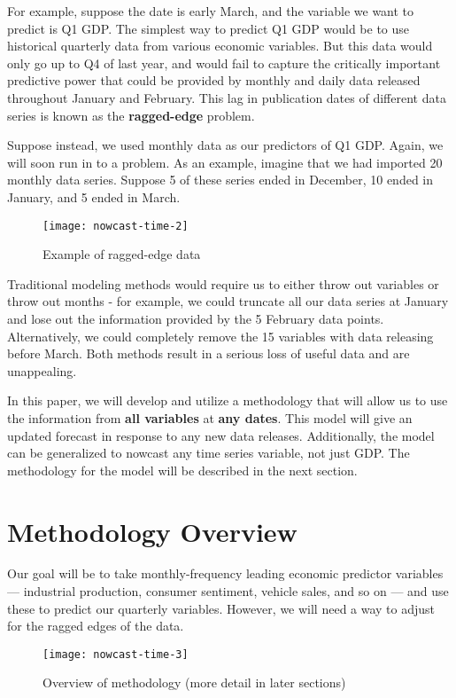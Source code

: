 \documentclass[11pt, letterpaper]{article}\usepackage[]{graphicx}\usepackage[]{color}
\begin{document}
For example, suppose the date is early March, and the variable we want to predict is Q1 GDP. The simplest way to predict Q1 GDP would be to use historical quarterly data from various economic variables. But this data would only go up to Q4 of last year, and would fail to capture the critically important predictive power that could be provided by monthly and daily data released throughout January and February. This lag in publication dates of different data series is known as the \textbf{ragged-edge} problem.

Suppose instead, we used monthly data as our predictors of Q1 GDP. Again, we will soon run in to a problem. As an example, imagine that we had imported 20 monthly data series. Suppose 5 of these series ended in December, 10 ended in January, and 5 ended in March. 

\begin{figure}[H]
\caption{Example of ragged-edge data}
\texttt{[image: nowcast-time-2]}
\centering
\end{figure}

Traditional modeling methods would require us to either throw out variables or throw out months - for example, we could truncate all our data series at January and lose out the information provided by the 5 February data points. Alternatively, we could completely remove the 15 variables with data releasing before March. Both methods result in a serious loss of useful data and are unappealing.

In this paper, we will develop and utilize a methodology that will allow us to use the information from \textbf{all variables} at \textbf{any dates}. This model will give an updated forecast in response to any new data releases. Additionally, the model can be generalized to nowcast any time series variable, not just GDP. The methodology for the model will be described in the next section.

\newpage
\section{Methodology Overview}
Our goal will be to take monthly-frequency leading economic predictor variables --- industrial production, consumer sentiment, vehicle sales, and so on --- and use these to predict our quarterly variables. However, we will need a way to adjust for the ragged edges of the data.

\begin{figure}[H]
\caption{Overview of methodology (more detail in later sections)}
\texttt{[image: nowcast-time-3]}
\centering
\end{figure}
\end{document}
